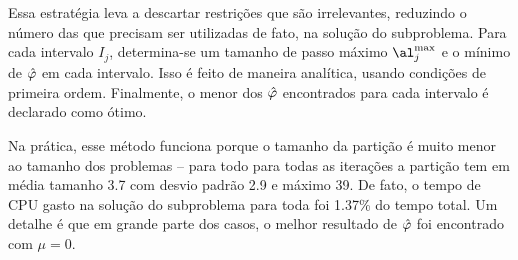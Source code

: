 Essa estratégia leva a descartar restrições que são irrelevantes, reduzindo o número das que precisam ser utilizadas de fato, na solução do subproblema.  Para cada intervalo $I_{j}$, determina-se um tamanho de passo máximo $\al^{\max}_{j}$ e o mínimo de $\hat{\varphi}$ em cada intervalo. Isso é feito 	de maneira analítica, usando condições de primeira ordem. Finalmente, o menor dos $\hat{\varphi}$ encontrados para cada intervalo é declarado como ótimo.

Na prática, esse método funciona porque o tamanho da partição é muito menor ao tamanho dos problemas -- para todo  para todas as iterações a partição tem em média tamanho \num{3.7} com desvio padrão \num{2.9} e máximo \num{39}. De fato, o tempo  de CPU gasto na solução do subproblema  para toda  foi \num{1,37}\% do tempo total. Um detalhe é que em grande parte dos casos, o melhor resultado de $\hat{\varphi}$ foi encontrado com $\mu=0$.



